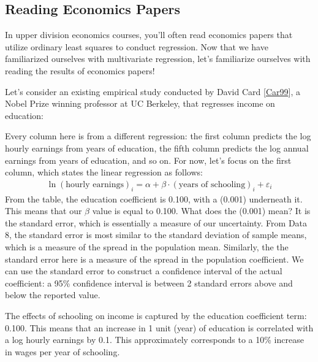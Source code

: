 \documentclass[letterpaper,10pt,english]{jupyterBook}
\begin{document}
\subsection{Reading Economics Papers}
\label{\detokenize{content/11-econometrics/reading-econ-papers:reading-economics-papers}}\label{\detokenize{content/11-econometrics/reading-econ-papers::doc}}
\sphinxAtStartPar
In upper division economics courses, you’ll often read economics papers that utilize ordinary least squares to conduct regression. Now that we have familiarized ourselves with multi\sphinxhyphen{}variate regression, let’s familiarize ourselves with reading the results of economics papers!

\sphinxAtStartPar
Let’s consider an existing empirical study conducted by David Card {[}\hyperlink{cite.content/references:id2}{Car99}{]}, a Nobel Prize winning professor at UC Berkeley, that regresses income on education:

\sphinxAtStartPar
{}

\sphinxAtStartPar
Every column here is from a different regression: the first column predicts the log hourly earnings from years of education, the fifth column predicts the log annual earnings from years of education, and so on. For now, let’s focus on the first column, which states the linear regression as follows:
\begin{equation*}
\begin{split}
\ln{(\text{hourly earnings})_i} = \alpha + \beta \cdot (\text{years of schooling})_i + \varepsilon_i
\end{split}
\end{equation*}
\sphinxAtStartPar
From the table, the education coefficient is 0.100, with a (0.001) underneath it. This means that our \(\beta\) value is equal to 0.100. What does the (0.001) mean? It is the standard error, which is essentially a measure of our uncertainty. From Data 8, the standard error is most similar to the standard deviation of sample means, which is a measure of the spread in the population mean. Similarly, the the standard error here is a measure of the spread in the population coefficient. We can use the standard error to construct a confidence interval of the actual coefficient: a 95\% confidence interval is between 2 standard errors above and below the reported value.

\sphinxAtStartPar
The effects of schooling on income is captured by the education coefficient term: 0.100. This means that an increase in 1 unit (year) of education is correlated with a log hourly earnings by 0.1. This approximately corresponds to a 10\% increase in wages per year of schooling.
\end{document}
